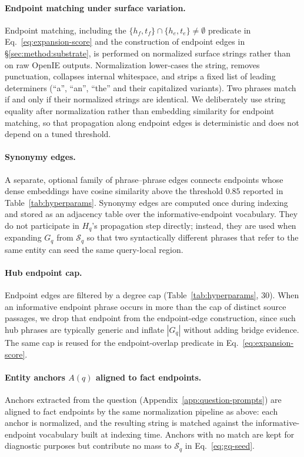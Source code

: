 \paragraph{Endpoint matching under surface variation.}
Endpoint matching, including the
$\{h_f,t_f\}\cap\{h_e,t_e\}\neq\emptyset$ predicate in
Eq.~\ref{eq:expansion-score} and the construction of endpoint edges
in \S\ref{sec:method:substrate}, is performed on normalized surface
strings rather than on raw OpenIE outputs. Normalization lower-cases
the string, removes punctuation, collapses internal whitespace, and
strips a fixed list of leading determiners (``a'', ``an'', ``the''
and their capitalized variants). Two phrases match if and only if
their normalized strings are identical. We deliberately use string
equality after normalization rather than embedding similarity for
endpoint matching, so that propagation along endpoint edges is
deterministic and does not depend on a tuned threshold.

\paragraph{Synonymy edges.}
A separate, optional family of phrase--phrase edges connects
endpoints whose dense embeddings have cosine similarity above the
threshold $0.85$ reported in Table~\ref{tab:hyperparams}. Synonymy
edges are computed once during indexing and stored as an adjacency
table over the informative-endpoint vocabulary. They do not
participate in $H_q$'s propagation step directly; instead, they are
used when expanding $G_q$ from $\mathcal{S}_q$ so that two
syntactically different phrases that refer to the same entity can
seed the same query-local region.

\paragraph{Hub endpoint cap.}
Endpoint edges are filtered by a degree cap (Table~\ref{tab:hyperparams},
$30$). When an informative endpoint phrase occurs in more than the
cap of distinct source passages, we drop that endpoint from the
endpoint-edge construction, since such hub phrases are typically
generic and inflate $|G_q|$ without adding bridge evidence. The same
cap is reused for the endpoint-overlap predicate in
Eq.~\ref{eq:expansion-score}.

\paragraph{Entity anchors $A(q)$ aligned to fact endpoints.}
Anchors extracted from the question (Appendix~\ref{app:question-prompts})
are aligned to fact endpoints by the same normalization pipeline as
above: each anchor is normalized, and the resulting string is
matched against the informative-endpoint vocabulary built at
indexing time. Anchors with no match are kept for diagnostic
purposes but contribute no mass to $\mathcal{S}_q$ in
Eq.~\ref{eq:gq-seed}.

